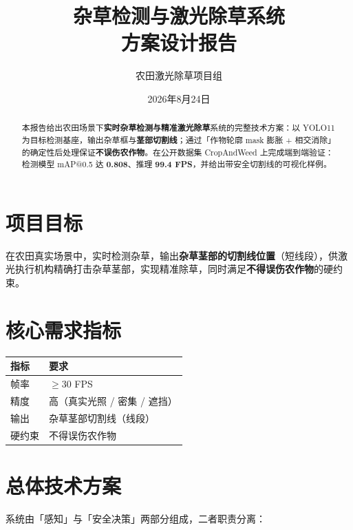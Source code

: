 \documentclass[11pt,a4paper]{article}
\title{\bfseries 杂草检测与激光除草系统\\[0.3em] \Large 方案设计报告}
\author{农田激光除草项目组}
\date{2026年8月24日}
\begin{document}
\maketitle
\vspace{-2em}

\begin{abstract}
本报告给出农田场景下\textbf{实时杂草检测与精准激光除草}系统的完整技术方案：以 YOLO11 为目标检测基座，输出杂草框与\textbf{茎部切割线}；通过「作物轮廓 mask 膨胀 + 相交消除」的确定性后处理保证\textbf{不误伤农作物}。在公开数据集 CropAndWeed 上完成端到端验证：检测模型 mAP@0.5 达 \textbf{0.808}、推理 \textbf{99.4 FPS}，并给出带安全切割线的可视化样例。
\end{abstract}

\tableofcontents
\newpage

\section{项目目标}

在农田真实场景中，实时检测杂草，输出\textbf{杂草茎部的切割线位置}（短线段），供激光执行机构精确打击杂草茎部，实现精准除草，同时满足\textbf{不得误伤农作物}的硬约束。

\section{核心需求指标}

\begin{table}[h]
\centering
\begin{tabular}{ll}
\toprule
\textbf{指标} & \textbf{要求} \\
\midrule
帧率 & $\ge 30$ FPS \\
精度 & 高（真实光照 / 密集 / 遮挡） \\
输出 & 杂草茎部切割线（线段） \\
硬约束 & 不得误伤农作物 \\
\bottomrule
\end{tabular}
\end{table}

\section{总体技术方案}

系统由「感知」与「安全决策」两部分组成，二者职责分离：
\end{document}
